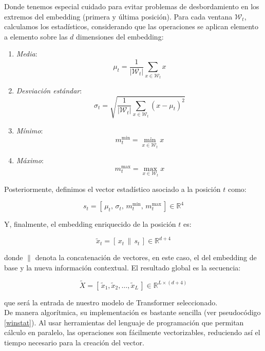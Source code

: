 Donde tenemos especial cuidado para evitar problemas de desbordamiento en los extremos del embedding (primera y última posición). Para cada ventana $\mathcal{W}_t$, calculamos los estadísticos, considerando que las operaciones se aplican elemento a elemento sobre las $d$ dimensiones del embedding:

\begin{enumerate}
	\item \textit{Media}:
	\[
	\mu_t = \frac{1}{|\mathcal{W}_t|} \sum_{x \in \mathcal{W}_t} x
	\]
	\item \textit{Desviación estándar}:
	\[
	\sigma_t = \sqrt{ \frac{1}{|\mathcal{W}_t|} \sum_{x \in \mathcal{W}_t} (x - \mu_t)^2 }
	\]
	\item \textit{Mínimo}:
	\[
	m^{\min}_t = \min_{x \in \mathcal{W}_t} x
	\]
	\item \textit{Máximo}:
	\[
	m^{\max}_t = \max_{x \in \mathcal{W}_t} x
	\]
\end{enumerate}

Posteriormente, definimos el vector estadístico asociado a la posición $t$ como:

\[
s_t = [\,\mu_t,\, \sigma_t,\, m^{\min}_t,\, m^{\max}_t\,] \in \mathbb{R}^{4}
\]

Y, finalmente, el embedding enriquecido de la posición $t$ es:

\[
\tilde{x}_t = [\,x_t \, \| \, s_t\,] \in \mathbb{R}^{d+4}
\]

donde $\|$ denota la concatenación de vectores, en este caso, el del embedding de base y la nueva información contextual. El resultado global es la secuencia:

\[
\tilde{X} = [\,\tilde{x}_1, \tilde{x}_2, \dots, \tilde{x}_L\,] \in \mathbb{R}^{L \times (d+4)}
\]

que será la entrada de nuestro modelo de Transformer seleccionado.\\

De manera algorítmica, su implementación es bastante sencilla (ver pseudocódigo \ref{winstat}). Al usar herramientas del lenguaje de programación que permitan cálculo en paralelo, las operaciones son fácilmente vectorizables, reduciendo así el tiempo necesario para la creación del vector.


